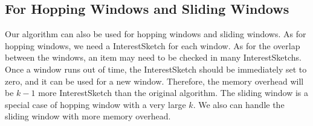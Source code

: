 \begin{comment}

\begin{figure}[htbp]
	\centering
	\prefig
	\texttt{[image: example\_per]}
	\prefigcaption\vvv\vvv
	\caption{\aname{} for finding persistent items.}
	\label{draw:persistency}
	\postfig \vvv\vvv
\end{figure}

\ppp{Example:}
As shown in Figure \ref{draw:persistency}, for a given data stream, we divide them into multiple equal-sized periods. 
%
For the first incoming item $a$, we get the three hashed bits ($1,0,1$), which means that item $a$ has not been recorded in the min-heap in this period. 
%
Therefore, we change the hashed bit from $0$ to $1$ in the Bloom filter and increment the persistency of $a$ by one in the min-heap. 
%
Next we calculate three hash functions $h_1(a),h_2(a),h_3(a)$ for the second incoming item $a$. 
%
The three hashed bits are all $1$, which indicates that $a$ has been recorded in this period and thus the second item $a$ is discarded. 
%
When the third item $g$ arrives, the third hashed bit is $0$, so we insert $g$ into the min-heap and change the third hashed bit from $0$ to $1$.
%
Since $g$ is not in the min-heap, we try to insert it into the root node by applying our PRI algorithm. 
%
At the end of each period, we empty the Bloom filter by setting all bits to $0$. 
%
In this way, when the fourth item $a$ arrives in the next period, the persistency of $a$ in the min-heap can be incremented by one regardless of the record in the previous period.
\end{comment}

%
%

\presub
\subsection{{\color{reviewD}For Hopping Windows and Sliding Windows}}
\postsub


{\color{reviewD}
Our algorithm can also be used for hopping windows and sliding windows.
As for hopping windows, we need a InterestSketch for each window. As for the overlap between the windows, an item may need to be checked in many InterestSketchs. Once a window runs out of time, the InterestSketch should be immediately set to zero, and it can be used for a new window. Therefore, the memory overhead will be $k-1$ more InterestSketch than the original algorithm. The sliding window is a special case of hopping window with a very large $k$. We also can handle the sliding window with more memory overhead.}




